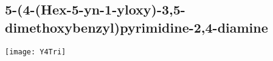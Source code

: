 
\subsection{5-(4-(Hex-5-yn-1-yloxy)-3,5-dimethoxybenzyl)pyrimidine-2,4-diamine }


\begin{scheme}[H]
	\begin{center}
		\texttt{[image: Y4Tri]}
	\end{center}
\end{scheme}

